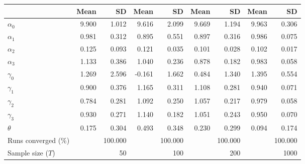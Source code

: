 
\begin{tabular}[t]{lrrrrrrrr}
\toprule
  & Mean & SD & Mean  & SD  & Mean   & SD   & Mean    & SD   \\
\midrule
$\alpha_{0}$ & 9.900 & 1.012 & 9.616 & 2.099 & 9.669 & 1.194 & 9.963 & 0.306\\
$\alpha_{1}$ & 0.981 & 0.312 & 0.895 & 0.551 & 0.897 & 0.316 & 0.986 & 0.075\\
$\alpha_{2}$ & 0.125 & 0.093 & 0.121 & 0.035 & 0.101 & 0.028 & 0.102 & 0.017\\
$\alpha_{3}$ & 1.133 & 0.386 & 1.040 & 0.236 & 0.878 & 0.182 & 0.983 & 0.058\\
$\gamma_{0}$ & 1.269 & 2.596 & -0.161 & 1.662 & 0.484 & 1.340 & 1.395 & 0.554\\
$\gamma_{1}$ & 0.900 & 0.376 & 1.165 & 0.311 & 1.108 & 0.281 & 0.940 & 0.071\\
$\gamma_{2}$ & 0.784 & 0.281 & 1.092 & 0.250 & 1.057 & 0.217 & 0.979 & 0.058\\
$\gamma_{3}$ & 0.930 & 0.271 & 1.140 & 0.182 & 1.051 & 0.243 & 0.950 & 0.070\\
$\theta$ & 0.175 & 0.304 & 0.493 & 0.348 & 0.230 & 0.299 & 0.094 & 0.174\\
Runs converged (\%) &  & 100.000 &  & 100.000 &  & 100.000 &  & 100.000\\
Sample size ($T$) &  & 50 &  & 100 &  & 200 &  & 1000\\
\bottomrule
\end{tabular}
